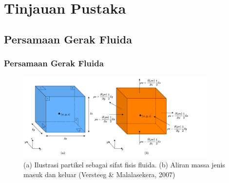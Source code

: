 \documentclass{beamer}
\begin{document}
\section{Tinjauan Pustaka}
\subsection{Persamaan Gerak Fluida}
\begin{frame}
	\frametitle{Persamaan Gerak Fluida}
	\begin{figure}[H]
		\centering
		\includegraphics[width=10cm]{cube.png}
		\caption{(a) Ilustrasi partikel sebagai sifat fisis fluida. (b) Aliran massa jenis masuk
			dan keluar (Versteeg \& Malalasekera, 2007)}
		\label{fig:cube}
	\end{figure}
\end{frame}
\end{document}
